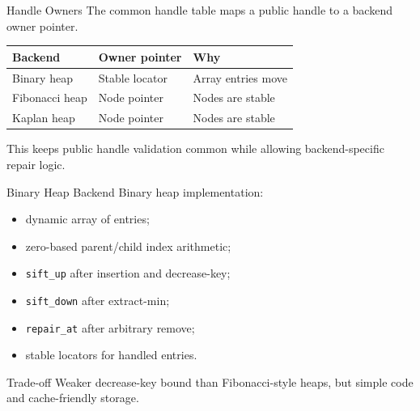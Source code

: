 \documentclass[10pt,aspectratio=43]{beamer}
\begin{document}
\begin{frame}{Handle Owners}
    The common handle table maps a public handle to a backend owner pointer.

    \begin{center}
        \begin{tabular}{lll}
            \toprule
            Backend        & Owner pointer  & Why                \\
            \midrule
            Binary heap    & Stable locator & Array entries move \\
            Fibonacci heap & Node pointer   & Nodes are stable   \\
            Kaplan heap    & Node pointer   & Nodes are stable   \\
            \bottomrule
        \end{tabular}
    \end{center}

    \vspace{0.5em}
    This keeps public handle validation common while allowing backend-specific repair logic.
\end{frame}

\begin{frame}{Binary Heap Backend}
    Binary heap implementation:

    \begin{itemize}
        \item dynamic array of entries;
        \item zero-based parent/child index arithmetic;
        \item \texttt{sift\_up} after insertion and decrease-key;
        \item \texttt{sift\_down} after extract-min;
        \item \texttt{repair\_at} after arbitrary remove;
        \item stable locators for handled entries.
    \end{itemize}

    \vspace{0.5em}
    \begin{block}{Trade-off}
        Weaker decrease-key bound than Fibonacci-style heaps, but simple code and cache-friendly storage.
    \end{block}
\end{frame}
\end{document}
